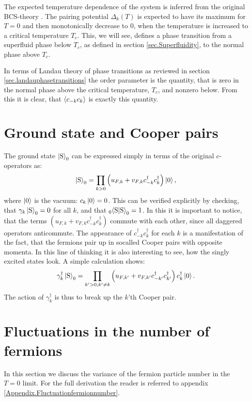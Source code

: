 The expected temperature dependence of the system is inferred from the original BCS-theory \cite[chapter 3]{Tinkham}. The pairing potential $\Delta_k(T)$ is expected to have its maximum for $T = 0$ and then monotonically decrease to 0, when the temperature is increased to a critical temperature $T_c$. This, we will see, defines a phase transition from a superfluid phase below $T_c$, as defined in section \ref{sec.Superfluidity}, to the normal phase above $T_c$. 

In terms of Landau theory of phase transitions as reviewed in section \ref{sec.landauphasetransitions} the order parameter is the quantity, that is zero in the normal phase above the critical temperature, $T_c$, and nonzero below. From this it is clear, that $\braket{c_{-k}c_k}$ is exactly this quantity.

\section{Ground state and Cooper pairs}
The ground state $\ket{\text{S}}_0$ can be expressed simply in terms of the original $c$-operators as:
\begin{equation}
\ket{\text{S}}_0 = \prod_{k > 0} \left(u_{F,k} + v_{F,k}c^\dagger_{-k}c^\dagger_k\right)\ket{0},
\end{equation} 
where $\ket{0}$ is the vacuum: $c_k\ket{0} = 0$. This can be verified explicitly by checking, that $\gamma_k\ket{\text{S}}_0 = 0$ for all $k$, and that $_{0}\!\braket{\text{S}|\text{S}}_0 = 1$. In this it is important to notice, that the terms $(u_{F,k} + v_{F,k}c^\dagger_{-k}c^\dagger_k)$ commute with each other, since all daggered operators anticommute. The appearance of $c^\dagger_{-k}c^\dagger_k$ for each $k$ is a manifestation of the fact, that the fermions pair up in socalled Cooper pairs with opposite momenta. In this line of thinking it is also interesting to see, how the singly excited states look. A simple calculation shows:
\begin{equation}
\gamma^\dagger_k\ket{\text{S}}_0 = \prod_{k' > 0, k' \neq k }\left(u_{F,k'} + v_{F,k'}c^\dagger_{-k'}c^\dagger_{k'}\right)c^\dagger_k\ket{0}.
\end{equation}
The action of $\gamma^\dagger_k$ is thus to break up the $k$'th Cooper pair. 

\section{Fluctuations in the number of fermions}
In this section we discuss the variance of the fermion particle number in the $T = 0$ limit. For the full derivation the reader is referred to appendix \ref{Appendix.Fluctuationfermionnumber}.

